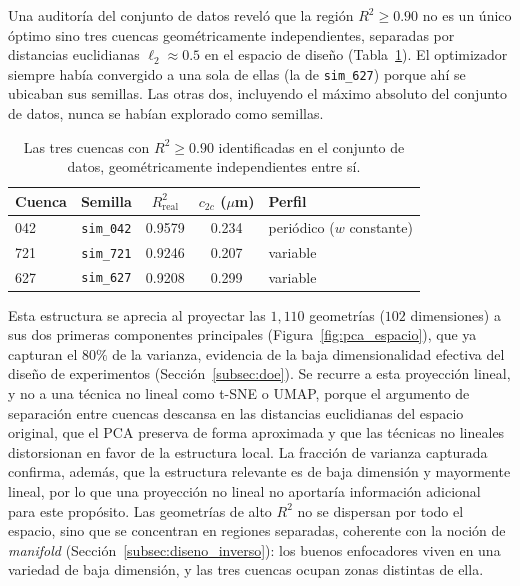Una auditoría del conjunto de datos reveló que la región $R^2 \geq 0.90$ no es un único óptimo sino tres cuencas geométricamente independientes, separadas por distancias euclidianas $\ell_2 \approx 0.5$ en el espacio de diseño (Tabla~\ref{tab:cuencas}). El optimizador siempre había convergido a una sola de ellas (la de \texttt{sim\_627}) porque ahí se ubicaban sus semillas. Las otras dos, incluyendo el máximo absoluto del conjunto de datos, nunca se habían explorado como semillas.

\begin{table}[H]
\centering
\small
\begin{tabular}{lcccl}
\toprule
\textbf{Cuenca} & \textbf{Semilla} & \textbf{$R^2_{\text{real}}$} & \textbf{$c_{2c}$ ($\mu$m)} & \textbf{Perfil} \\
\midrule
042 & \texttt{sim\_042} & 0.9579 & 0.234 & periódico ($w$ constante) \\
721 & \texttt{sim\_721} & 0.9246 & 0.207 & variable \\
627 & \texttt{sim\_627} & 0.9208 & 0.299 & variable \\
\bottomrule
\end{tabular}
\caption{Las tres cuencas con $R^2 \geq 0.90$ identificadas en el conjunto de datos, geométricamente independientes entre sí.}
\label{tab:cuencas}
\end{table}

Esta estructura se aprecia al proyectar las $1{,}110$ geometrías ($102$ dimensiones) a sus dos primeras componentes principales (Figura~\ref{fig:pca_espacio}), que ya capturan el $80\%$ de la varianza, evidencia de la baja dimensionalidad efectiva del diseño de experimentos (Sección~\ref{subsec:doe}). Se recurre a esta proyección lineal, y no a una técnica no lineal como t-SNE o UMAP, porque el argumento de separación entre cuencas descansa en las distancias euclidianas del espacio original, que el PCA preserva de forma aproximada y que las técnicas no lineales distorsionan en favor de la estructura local. La fracción de varianza capturada confirma, además, que la estructura relevante es de baja dimensión y mayormente lineal, por lo que una proyección no lineal no aportaría información adicional para este propósito. Las geometrías de alto $R^2$ no se dispersan por todo el espacio, sino que se concentran en regiones separadas, coherente con la noción de
\emph{manifold} (Sección~\ref{subsec:diseno_inverso}): los buenos enfocadores viven en una variedad de baja dimensión, y las tres cuencas ocupan zonas distintas de ella.

